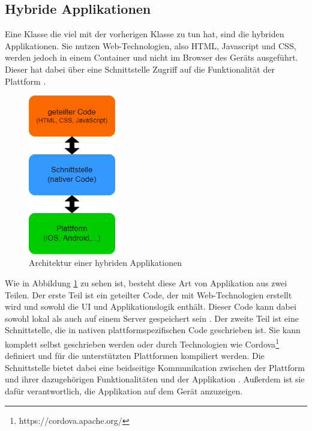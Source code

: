 \subsection{Hybride Applikationen}
Eine Klasse die viel mit der vorherigen Klasse zu tun hat, sind die hybriden Applikationen.
Sie nutzen Web-Technologien, also HTML, Javascript und CSS, werden jedoch in einem Container und nicht im Browser des Geräts ausgeführt.
Dieser hat dabei über eine Schnittstelle Zugriff auf die Funktionalität der Plattform \cite{IEEE_development_classes}.

\begin{figure}[ht]
  \centering
  \includegraphics[height=7cm,keepaspectratio]{images/hybrid_architecture.drawio.png} 
  \caption{Architektur einer hybriden Applikationen}
  \label{fig:hybrid_architecture}
\end{figure}

Wie in Abbildung \ref{fig:hybrid_architecture} zu sehen ist, besteht diese Art von Applikation aus zwei Teilen.
Der erste Teil ist ein geteilter Code, der mit Web-Technologien erstellt wird und sowohl die UI und Applikationslogik enthält. Dieser Code kann dabei sowohl lokal als auch auf einem Server gespeichert sein \cite{2017hybrid_approach_end}.
Der zweite Teil ist eine Schnittstelle, die in nativen plattformspezifischen Code geschrieben ist. Sie kann komplett selbst geschrieben werden oder durch Technologien wie Cordova\footnote{https://cordova.apache.org/} definiert und für die unterstützten Plattformen kompiliert werden. Die Schnittstelle bietet dabei eine beidseitige Kommunikation zwischen der Plattform und ihrer dazugehörigen Funktionalitäten und der Applikation \cite{ELKASSAS2017163}. Außerdem ist sie dafür verantwortlich, die Applikation auf dem Gerät anzuzeigen. 

